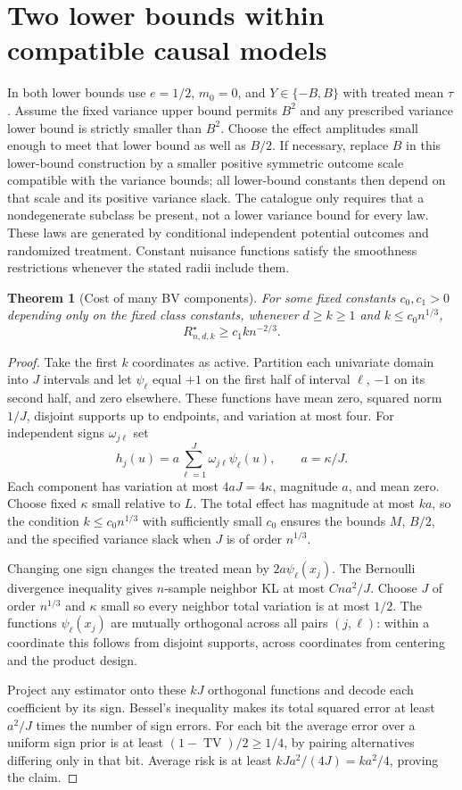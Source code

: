 \documentclass[11pt]{article}
\newtheorem{theorem}{Theorem}
\theoremstyle{remark}
\newcommand{\TV}{\operatorname{TV}}
\begin{document}
\section{Two lower bounds within compatible causal models}
In both lower bounds use $e=1/2$, $m_0=0$, and $Y\in\{-B,B\}$ with treated mean $\tau$. Assume the fixed variance upper bound permits $B^2$ and any prescribed variance lower bound is strictly smaller than $B^2$. Choose the effect amplitudes small enough to meet that lower bound as well as $B/2$. If necessary, replace $B$ in this lower-bound construction by a smaller positive symmetric outcome scale compatible with the variance bounds; all lower-bound constants then depend on that scale and its positive variance slack. The catalogue only requires that a nondegenerate subclass be present, not a lower variance bound for every law. These laws are generated by conditional independent potential outcomes and randomized treatment. Constant nuisance functions satisfy the smoothness restrictions whenever the stated radii include them.

\begin{theorem}[Cost of many BV components]\label{nonparam}
For some fixed constants $c_0,c_1>0$ depending only on the fixed class constants, whenever $d\geq k\geq1$ and $k\leq c_0n^{1/3}$,
\[
                        R_{n,d,k}^\star\geq c_1 k n^{-2/3}.
\]
\end{theorem}
\begin{proof}
Take the first $k$ coordinates as active. Partition each univariate domain into $J$ intervals and let $\psi_\ell$ equal $+1$ on the first half of interval $\ell$, $-1$ on its second half, and zero elsewhere. These functions have mean zero, squared norm $1/J$, disjoint supports up to endpoints, and variation at most four. For independent signs $\omega_{j\ell}$ set
\[
 h_j(u)=a\sum_{\ell=1}^J\omega_{j\ell}\psi_\ell(u),
 \qquad a=\kappa/J.
\]
Each component has variation at most $4aJ=4\kappa$, magnitude $a$, and mean zero. Choose fixed $\kappa$ small relative to $L$. The total effect has magnitude at most $ka$, so the condition $k\leq c_0n^{1/3}$ with sufficiently small $c_0$ ensures the bounds $M$, $B/2$, and the specified variance slack when $J$ is of order $n^{1/3}$.

Changing one sign changes the treated mean by $2a\psi_\ell(x_j)$. The Bernoulli divergence inequality gives $n$-sample neighbor KL at most $Cna^2/J$. Choose $J$ of order $n^{1/3}$ and $\kappa$ small so every neighbor total variation is at most $1/2$. The functions $\psi_\ell(x_j)$ are mutually orthogonal across all pairs $(j,\ell)$: within a coordinate this follows from disjoint supports, across coordinates from centering and the product design.

Project any estimator onto these $kJ$ orthogonal functions and decode each coefficient by its sign. Bessel's inequality makes its total squared error at least $a^2/J$ times the number of sign errors. For each bit the average error over a uniform sign prior is at least $(1-\TV)/2\geq1/4$, by pairing alternatives differing only in that bit. Average risk is at least $kJa^2/(4J)=ka^2/4$, proving the claim.
\end{proof}
\end{document}
